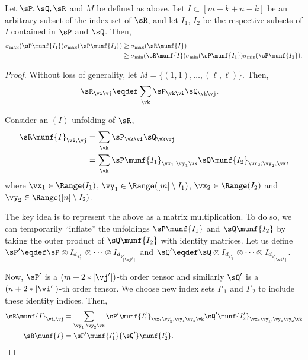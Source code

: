 \begin{lemma}
  \label{lem:tensor-multiplication}
Let $\sP, \sQ, \sR$ and $M$ be defined as above. 
Let $I \subset [m - k + n - k]$ be an arbitrary subset of the index set of $\sR$,
  and let $I_1$, $I_2$ be the respective subsets of $I$ contained in $\sP$ and $\sQ$.
Then,
\begin{align*}
  \sigma_{\max}(\sP\munf{I_1}) \sigma_{\max}(\sP\munf{I_2}) 
&\ge \sigma_{\max}(\sR\munf{I})  \\
&\ge \sigma_{\min}(\sR\munf{I}) 
\sigma_{\min}(\sP\munf{I_1}) \sigma_{\min}(\sP\munf{I_2}).
\end{align*}
\end{lemma}
\begin{proof}
  Without loss of generality, let $M = \{(1,1), \ldots, (\ell,\ell)\}$. 
  Then,
  \begin{align*}
    \sR_{\vi\vj} &\eqdef \sum_{\vk} \sP_{\vk \vi} \sQ_{\vk \vj}.
  \end{align*}

Consider an $(I)$-unfolding of $\sR$,
  \begin{align*}
    \sR\munf{I}_{\vi,\vj} 
       &= \sum_{\vk} \sP_{\vk \vi} \sQ_{\vk \vj} \\
       &= \sum_{\vk} \sP\munf{I_1}_{\vx_1; \vy_1 \vk} \sQ\munf{I_2}_{\vx_2; \vy_2, \vk},
  \end{align*}
  where $\vx_1 \in \Range(I_1)$, $\vy_1 \in \Range([m] \setminus I_1)$, $\vx_2 \in \Range(I_2)$ and $\vy_2  \in \Range([n] \setminus I_2)$.

The key idea is to represent the above as a matrix multiplication.
To do so, we can temporarily ``inflate'' the unfoldings $\sP\munf{I_1}$
  and $\sQ\munf{I_2}$ by taking the outer product of $\sQ\munf{I_2}$ with
  identity matrices. Let us define 
  $\sP' \eqdef \sP \otimes I_{d_{j'_1}} \otimes \cdots \otimes I_{d_{j'_{|\vj'|}}}$ and 
  $\sQ' \eqdef \sQ \otimes I_{d_{i'_1}} \otimes \cdots \otimes I_{d_{i'_{|\vi'|}}}$.

Now, $\sP'$ is a $(m + 2 * |\vj'|)$-th order tensor and similarly $\sQ'$ is a $(n + 2 * |\vi'|)$-th 
  order tensor. We choose new index sets $I'_1$ and $I'_2$ to include these identity indices. 
Then,
  \begin{align*}
    \sR\munf{I}_{\vi,\vj} 
    &= \sum_{\vy_1, \vy_2 \vk}
    {\sP'}\munf{I'_1}_{\vx_1\vy'_2, \vy_1 \vy_2 \vk} {\sQ'}\munf{I'_2}_{\vx_2\vy'_1, \vy_1 \vy_2 \vk} \\
          \sR\munf{I} &= {\sP'}\munf{I'_1} {\sQ'}\munf{I'_2}.
  \end{align*}


\end{proof}
